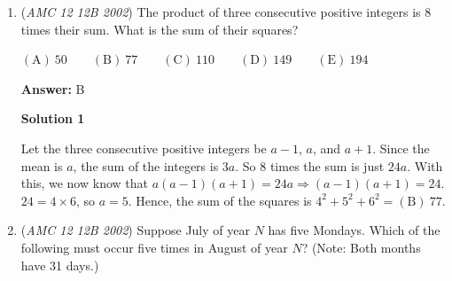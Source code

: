 \begin{enumerate}
\textbf{Solution 3}

Since $a$ and $b$ are solutions to the given equation, we can write the two equations $a^2 + a^2 + b = 2a^2 + b = 0,$ and $b^2 + ab + b = 0.$ From the first equation, we get that $b = -2a^2,$ and substituting this in our second equation, we get that $4a^4 - 2a^3 - 2a^2 = 0,$ and solving this gives us the solutions $a = -\frac{1}{2},$ $a = 0$ and $a = 1.$ We discard the first two solutions, as the first one doesnt show up in the answer choices and we are given that $a$ is nonzero. The only valid solution is then $a = 1,$ which gives us $b = -2,$ and $(a, b) = \boxed{\text{(C) } (1, -2)}$




\textbf{Solution 4 (Using the Answer Choices)}

Note that for roots $a$ and $b$, $ab = b$. This implies that $a=1$, and there is only one answer choice with $1$ in the position for $a$, hence, $(a,b) = \boxed{\mathrm{(C)}\ (1,-2)}$




\textbf{Solution 5(Answer Choices)}

We can use Vieta's formulas to solve this. We know that $a + b = -a$, and $ab = b.$ We can test the answer choices, so that we find that $\boxed{\mathrm{(C)}\ (1,-2)}$ works.

 -monkey\_land

 


	\item (\textit{AMC 12 12B 2002}) The product of three consecutive positive integers is $8$ times their sum. What is the sum of their squares?


 $\mathrm{(A)}\ 50 \qquad\mathrm{(B)}\ 77 \qquad\mathrm{(C)}\ 110 \qquad\mathrm{(D)}\ 149 \qquad\mathrm{(E)}\ 194$

 \textbf{Answer: }B



\textbf{Solution 1}

Let the three consecutive positive integers be $a-1$, $a$, and $a+1$. Since the mean is $a$, the sum of the integers is $3a$. So $8$ times the sum is just $24a$. With this, we now know that $a(a-1)(a+1)=24a\Rightarrow(a-1)(a+1)=24$.  $24=4\times6$, so $a=5$. Hence, the sum of the squares is $4^2+5^2+6^2=\boxed{\mathrm{ (B)}\ 77}$.

 


	\item (\textit{AMC 12 12B 2002}) Suppose July of year $N$ has five Mondays. Which of the following must occur five times in August of year $N$? (Note: Both months have 31 days.)



\end{enumerate}
